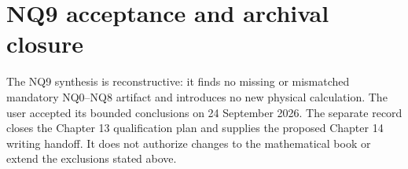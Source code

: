 \documentclass[11pt]{article}
\begin{document}
\section{NQ9 acceptance and archival closure}

The NQ9 synthesis is reconstructive: it finds no missing or mismatched
mandatory NQ0--NQ8 artifact and introduces no new physical calculation.  The
user accepted its bounded conclusions on 24 September 2026.  The separate
record  closes the
Chapter 13 qualification plan and supplies the proposed Chapter 14 writing
handoff.  It does not authorize changes to the mathematical book or extend
the exclusions stated above.
\end{document}
